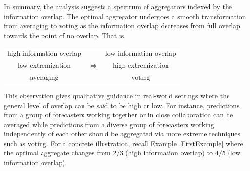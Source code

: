\documentclass[12pt]{article}
\newtheorem{observation}[theorem]{Observation}
\newtheorem{proposition}[theorem]{Proposition}
\theoremstyle{definition}
\theoremstyle{definition}
\begin{document}
In summary, the analysis suggests a spectrum of aggregators indexed by
the information overlap.  The optimal aggregator undergoes a smooth
transformation from averaging to voting as
the information overlap decreases from full overlap towards the point
of no overlap.
That is,
\begin{center}
\begin{tabular}{ccc}
high information overlap & & low information overlap\\
low extremization & {\Large $\Longleftrightarrow$} & high extremization \\
averaging  & & voting\\
\end{tabular}
\end{center}
This observation gives qualitative guidance in real-world settings
where the general level of overlap can be said to be high or low.  For
instance, predictions from a group of forecasters working together or in
close collaboration can be averaged while predictions from a diverse
group of forecasters working independently of each other should be
aggregated via more extreme techniques such as voting. For a concrete illustration, recall  Example \ref{FirstExample} where the optimal aggregate changes from $2/3$ (high information overlap) to $4/5$ (low information overlap). 



%
\end{document}
